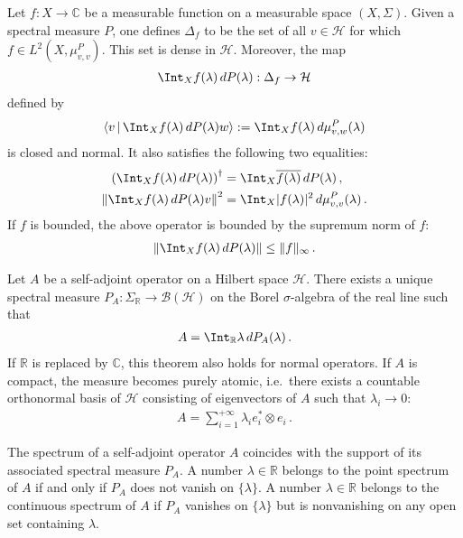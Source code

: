     \begin{property}
        Let $f:X\rightarrow\mathbb{C}$ be a measurable function on a measurable space $(X,\Sigma)$. Given a spectral measure $P$, one defines $\Delta_f$ to be the set of all $v\in\mathcal{H}$ for which $f\in L^2(X,\mu^P_{v,v})$. This set is dense in $\mathcal{H}$. Moreover, the map
        \begin{gather}
            \Int_Xf(\lambda)\,dP(\lambda):\Delta_f\rightarrow\mathcal{H}
        \end{gather}
        defined by
        \begin{gather}
            \left\langle v\,\middle\vert\,\Int_Xf(\lambda)\,dP(\lambda)w\right\rangle := \Int_Xf(\lambda)\,d\mu^P_{v,w}(\lambda)
        \end{gather}
        is closed and normal. It also satisfies the following two equalities:
        \begin{align}
            \left(\Int_Xf(\lambda)\,dP(\lambda)\right)^\dag &= \Int_X\overline{f(\lambda)}\,dP(\lambda)\,,\\
            \left\|\Int_Xf(\lambda)\,dP(\lambda)v\right\|^2 &= \Int_X|f(\lambda)|^2\,d\mu^P_{v,v}(\lambda)\,.
        \end{align}
        If $f$ is bounded, the above operator is bounded by the supremum norm of $f$:
        \begin{gather}
            \left\|\Int_Xf(\lambda)\,dP(\lambda)\right\|\leq\|f\|_\infty\,.
        \end{gather}
    \end{property}

    \begin{theorem}\label{operators:spectral_theorem}
        Let $A$ be a self-adjoint operator on a Hilbert space $\mathcal{H}$. There exists a unique spectral measure $P_A:\Sigma_{\mathbb{R}}\rightarrow\mathcal{B}(\mathcal{H})$ on the Borel $\sigma$-algebra of the real line such that
        \begin{gather}
            A = \Int_{\mathbb{R}}\lambda\,dP_A(\lambda)\,.
        \end{gather}
        If $\mathbb{R}$ is replaced by $\mathbb{C}$, this theorem also holds for normal operators. If $A$ is compact, the measure becomes purely atomic, i.e.~there exists a countable orthonormal basis of $\mathcal{H}$ consisting of eigenvectors of $A$ such that $\lambda_i\longrightarrow0$:
        \begin{gather}
            A = \sum_{i=1}^{+\infty}\lambda_ie_i^*\otimes e_i\,.
        \end{gather}
    \end{theorem}
    \begin{property}
        The spectrum of a self-adjoint operator $A$ coincides with the support of its associated spectral measure $P_A$. A number $\lambda\in\mathbb{R}$ belongs to the point spectrum of $A$ if and only if $P_A$ does not vanish on $\{\lambda\}$. A number $\lambda\in\mathbb{R}$ belongs to the continuous spectrum of $A$ if $P_A$ vanishes on $\{\lambda\}$ but is nonvanishing on any open set containing $\lambda$.
    \end{property}

